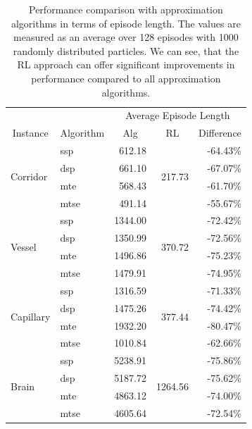 \begin{table}[htp]
    \begin{center}
        \begin{tabular}{llrrr}
            \toprule
            & & \multicolumn{3}{c}{Average Episode Length} \\
            \cmidrule(lr){3-5} 
            \multicolumn{1}{c}{Instance} & \multicolumn{1}{c}{Algorithm} & \multicolumn{1}{c}{Alg} & \multicolumn{1}{c}{RL} & \multicolumn{1}{c}{Difference} \\
            \midrule
            \multirow{4}{*}{Corridor} & ssp & 612.18 & \multirow{4}{*}{217.73} & -64.43\% \\
            & dsp & 661.10 & & -67.07\% \\
            & mte & 568.43 & & -61.70\% \\
            & mtse & 491.14 & & -55.67\% \\
            \midrule
            \multirow{4}{*}{Vessel} & ssp & 1344.00 & \multirow{4}{*}{370.72} & -72.42\% \\
            & dsp & 1350.99 & & -72.56\% \\
            & mte & 1496.86 & & -75.23\% \\
            & mtse & 1479.91 & & -74.95\% \\
            \midrule
            \multirow{4}{*}{Capillary} & ssp & 1316.59 & \multirow{4}{*}{377.44} & -71.33\% \\
            & dsp & 1475.26 & & -74.42\% \\
            & mte & 1932.20 & & -80.47\% \\
            & mtse & 1010.84 & & -62.66\% \\
            \midrule
            \multirow{4}{*}{Brain} & ssp & 5238.91 & \multirow{4}{*}{1264.56} & -75.86\% \\
            & dsp & 5187.72 & & -75.62\% \\
            & mte & 4863.12 & & -74.00\% \\
            & mtse & 4605.64 & & -72.54\% \\
            \bottomrule
        \end{tabular}

    \end{center}
    \caption[Performance Comparison with Approximation Algorithms]{Performance comparison with approximation algorithms in terms of episode length. The values are measured as an average over 128 episodes with 1000 randomly distributed particles. We can see, that the RL approach can offer significant improvements in performance compared to all approximation algorithms.} \label{tab:Eval/PreviousAlgorithmicApproach}
\end{table}


